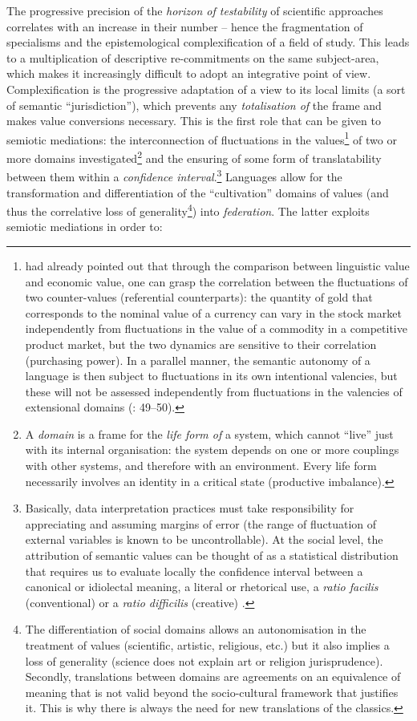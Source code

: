 \documentclass[output=paper]{langscibook}
\begin{document}
The progressive precision of the \textit{horizon of testability} of scientific approaches correlates with an increase in their number – hence the fragmentation of specialisms and the epistemological complexification of a field of study. This leads to a multiplication of descriptive re-commitments on the same subject-area, which makes it increasingly difficult to adopt an integrative point of view. Complexification is the progressive adaptation of a view to its local limits (a sort of semantic “jurisdiction”), which prevents any \textit{totalisation of} the frame and makes value conversions necessary. This is the first role that can be given to semiotic mediations: the interconnection of fluctuations in the values\footnote{ had already pointed out that through the comparison between linguistic value and economic value, one can grasp the correlation between the fluctuations of two counter-values (referential counterparts): the quantity of gold that corresponds to the nominal value of a currency can vary in the stock market independently from fluctuations in the value of a commodity in a competitive product market, but the two dynamics are sensitive to their correlation (purchasing power). In a parallel manner, the semantic autonomy of a language is then subject to fluctuations in its own intentional valencies, but these will not be assessed independently from fluctuations in the valencies of extensional domains (\citealt{BassoFossali2007}: 49--50).} of two or more domains investigated\footnote{A \textit{domain} is a frame for the \textit{life form of} a system, which cannot “live” just with its internal organisation: the system depends on one or more couplings with other systems, and therefore with an environment. Every life form necessarily involves an identity in a critical state (productive imbalance).}  and the ensuring of some form of translatability between them within a \textit{confidence interval}.\footnote{Basically, data interpretation practices must take responsibility for appreciating and assuming margins of error (the range of fluctuation of external variables is known to be uncontrollable). At the social level, the attribution of semantic values can be thought of as a statistical distribution that requires us to evaluate locally the confidence interval between a canonical or idiolectal meaning, a literal or rhetorical use, a \textit{ratio facilis} (conventional) or a \textit{ratio difficilis} (creative) \citep[cf.][133]{Eco1986}.} Languages allow for the transformation and differentiation of the “cultivation” domains of values (and thus the correlative loss of generality\footnote{The differentiation of social domains allows an autonomisation in the treatment of values (scientific, artistic, religious, etc.) but it also implies a loss of generality (science does not explain art or religion jurisprudence). Secondly, translations between domains are agreements on an equivalence of meaning that is not valid beyond the socio-cultural framework that justifies it. This is why there is always the need for new translations of the classics.}) into \textit{federation}. The latter exploits semiotic mediations in order to:
\end{document}
